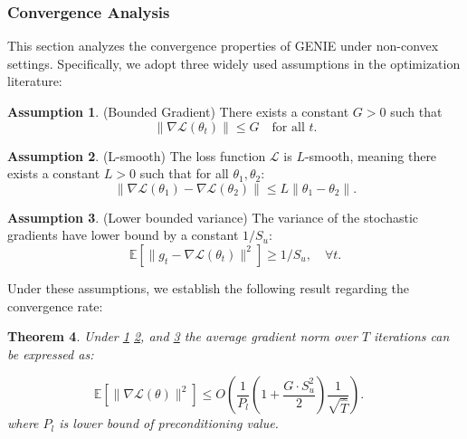 \documentclass{article}
\theoremstyle{plain}
\newtheorem{theorem}{Theorem}[section]
\theoremstyle{definition}
\newtheorem{assumption}[theorem]{Assumption}
\theoremstyle{remark}
\begin{document}
\subsubsection{Convergence Analysis}
\label{method: Convergence Analysis}
This section analyzes the convergence properties of GENIE under non-convex settings. Specifically, we adopt three widely used assumptions in the optimization literature:

\begin{assumption}
\label{ass:Bounded Gradient}
(Bounded Gradient) There exists a constant \( G > 0 \) such that
\begin{equation}
\|\nabla \mathcal{L}(\theta_t)\| \leq G \quad \text{for all } t.
\end{equation}
\end{assumption}

\begin{assumption}
\label{ass:L-smooth}
(L-smooth) The loss function \(\mathcal{L}\) is \(L\)-smooth, meaning there exists a constant \( L > 0 \) such that for all \(\theta_1, \theta_2\):
\begin{equation}
\|\nabla \mathcal{L}(\theta_1) - \nabla \mathcal{L}(\theta_2)\|
\leq L \|\theta_1 - \theta_2\|.
\end{equation}
\end{assumption}
\begin{assumption}
\label{ass:Bounded Variance}
(Lower bounded variance) The variance of the stochastic gradients have lower bound by a constant $1/S_u$:
\begin{equation}
\mathbb{E}[\|g_t - \nabla \mathcal{L}(\theta_t)\|^2] \geq 1/S_u, \quad \forall t.
\end{equation}
\end{assumption}
Under these assumptions, we establish the following result regarding the convergence rate:

\begin{theorem}\label{thm:th2}
Under \cref{ass:Bounded Gradient} \cref{ass:L-smooth}, and \cref{ass:Bounded Variance} the average gradient norm over \(T\) iterations can be expressed as:

\begin{equation}
      \mathbb{E}[\|\nabla \mathcal{L}(\theta)\|^2]
    \leq O\left( \frac{1}{P_l}\left(1 + \frac{G \cdot S_u^2}{2}\right) \frac{1}{\sqrt{\hat{T}}}\right)
    .\quad 
\end{equation}
where $P_l$ is lower bound of preconditioning value.
\end{theorem}
\end{document}
